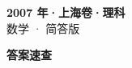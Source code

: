\documentclass[zihao=-4, a4paper]{ctexart}
\begin{document}
\begin{center}
  {\Large\bfseries 2007 年·上海卷·理科}\\[4pt]
  {\large 数学 · 简答版}
\end{center}
\medskip
{}

\clearpage
{}
\begin{center}{\Large\bfseries 答案速查}\end{center}
\medskip

\end{document}
